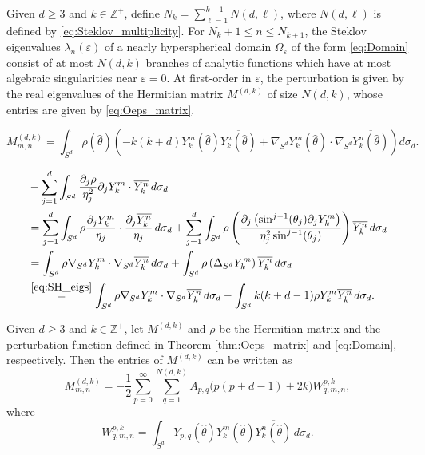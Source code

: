 \documentclass[10pt,a4paper]{amsart}
\newcommand{\Z}{\mathbb{Z}}
\newcommand{\cc}{\overline}
\newcommand{\del}{\partial}
\newcommand{\vareps}{\varepsilon}
\begin{document}
\begin{theorem} \label{thm:Oeps_matrix} 
Given $d\ge 3$ and $k\in\Z^+$, define $N_k = \sum_{\ell = 1}^{k - 1} N(d, \ell)$, where $N(d, \ell)$ is defined by \eqref{eq:Steklov_multiplicity}. For $N_k + 1\le n\le N_{k + 1}$, the Steklov eigenvalues $\lambda_n(\vareps)$ of a nearly hyperspherical domain $\Omega_\vareps$ of the form \eqref{eq:Domain} consist of at most $N(d, k)$ branches of analytic functions which have at most algebraic singularities near $\vareps = 0$. At first-order in $\vareps$, the perturbation is given by the real eigenvalues of the Hermitian matrix $M^{(d, k)}$ of size $N(d, k)$, whose entries are given by \eqref{eq:Oeps_matrix}. 
\end{theorem} 

\begin{equation} \label{eq:Oeps_matrix1} 
M_{m, n}^{(d, k)} = \int_{S^d} \rho(\hat\theta)\left(-k(k + d)Y_k^m(\hat\theta)\cc{Y_k^n(\hat\theta)} + \nabla_{S^d}Y_k^m(\hat\theta)\cdot\nabla_{S^d}\cc{Y_k^n(\hat\theta)}\right) d\sigma_d. 
\end{equation} 

\begin{gather} \label{eq:Oeps_matrix1b} 
\begin{aligned} 
& -\sum_{j = 1}^d \int_{S^d} \frac{\del_j\rho}{\eta_j^2}\del_jY_k^m\cdot \cc{Y_k^n}\, d\sigma_d \\ 
& = \sum_{j = 1}^d \int_{S^d} \rho\frac{\del_jY_k^m}{\eta_j}\cdot \frac{\del_j\cc{Y_k^n}}{\eta_j}\, d\sigma_d + \sum_{j = 1}^d \int_{S^d} \rho \left(\frac{\del_j\left(\sin^{j - 1}(\theta_j)\del_jY_k^m\right)}{\eta_j^2\sin^{j - 1}(\theta_j)}\right) \cc{Y_k^n}\, d\sigma_d \\ 
& = \int_{S^d} \rho\nabla_{S^d}Y_k^m\cdot \nabla_{S^d}\cc{Y_k^n}\, d\sigma_d + \int_{S^d} \rho\left(\Delta_{S^d}Y_k^m\right)\cc{Y_k^n}\, d\sigma_d \\ 
& \stackrel{\eqref{eq:SH_eigs}}{=} \int_{S^d} \rho\nabla_{S^d}Y_k^m\cdot \nabla_{S^d}\cc{Y_k^n}\, d\sigma_d - \int_{S^d} k(k + d - 1)\rho Y_k^m\cc{Y_k^n}\, d\sigma_d. 
\end{aligned} 
\end{gather} 

\begin{lemma} \label{thm:Matrix_triple}
Given $d\ge 3$ and $k\in\Z^+$, let $M^{(d, k)}$ and $\rho$ be the Hermitian matrix and the perturbation function defined in Theorem \ref{thm:Oeps_matrix} and \eqref{eq:Domain}, respectively. Then the entries of $M^{(d, k)}$ can be written as 
\begin{equation} \label{eq:Matrix_triple} 
M_{m ,n}^{(d, k)} = -\frac{1}{2}\sum_{p = 0}^\infty\sum_{q = 1}^{N(d, k)} A_{p, q}\Big(p(p + d - 1) + 2k\Big)W_{q, m, n}^{p, k}, 
\end{equation} 
where 
\begin{equation*} 
W_{q, m, n}^{p, k} = \int_{S^d} Y_{p, q}(\hat\theta)Y_k^m(\hat\theta)\cc{Y_k^n(\hat\theta)}\, d\sigma_d. 
\end{equation*} 
\end{lemma} 
\end{document}
